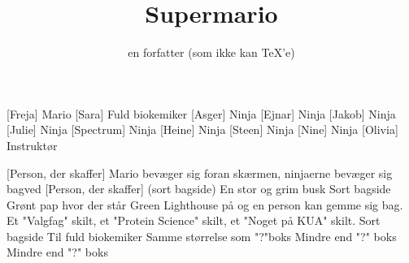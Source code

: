 \documentclass[a4paper,11pt]{article}
\title{Supermario}
\author{en forfatter (som ikke kan \TeX'e)}
\begin{document}
\maketitle

\begin{roles}
    [Freja] Mario
    [Sara] Fuld biokemiker
    [Asger]  Ninja
    [Ejnar]  Ninja
    [Jakob]  Ninja
    [Julie]  Ninja
    [Spectrum]  Ninja
    [Heine]  Ninja
    [Steen]  Ninja
    [Nine]  Ninja
    [Olivia]  Instruktør
\end{roles}

\begin{props}
    [Person, der skaffer] Mario bevæger sig foran skærmen, ninjaerne bevæger sig bagved
    [Person, der skaffer] (sort bagside)
     En stor og grim busk
     Sort bagside
     Grønt pap hvor der står Green Lighthouse på og en person kan gemme sig bag.
     Et "Valgfag" skilt, et "Protein Science" skilt, et "Noget på KUA" skilt.
     Sort bagside
     Til fuld biokemiker
     Samme størrelse som "?"boks
     Mindre end "?" boks
     Mindre end "?" boks
\end{props}
\end{document}

